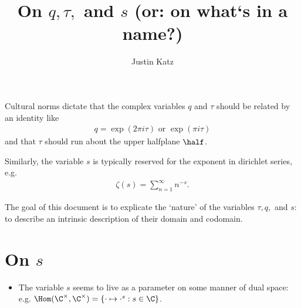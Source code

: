 \documentclass[12pt]{amsart}
\title{On $q,\tau,$ and $s$ (or: on what`s in a name?)}
\author{Justin Katz}
\begin{document}
\maketitle

Cultural norms dictate that the complex variables $q$ and $\tau$ should be related by an identity like 
\begin{align*}
	 q = \exp(2\pi i \tau) \text{ or } \exp (\pi i \tau)
\end{align*}
and that $\tau$ should run about the upper halfplane $\half$.

Similarly, the variable $s$ is typically reserved for the exponent in dirichlet series, e.g. 
\begin{align*}
	\zeta(s)=\sum_{n=1}^\infty n^{-s}. 	
\end{align*}

The goal of this document is to explicate the `nature' of the variables $\tau,q,$ and $s$: to describe an intrinsic description of their domain and codomain.

\section{On $s$}


\begin{itemize}
	\item The variable $s$ seems to live as a parameter on some manner of dual space: e.g. $\Hom(\C^\times , \C^\times)= \{ \cdot \mapsto \cdot^s:  s\in \C\}$. 
\end{itemize}

 


\end{document}
